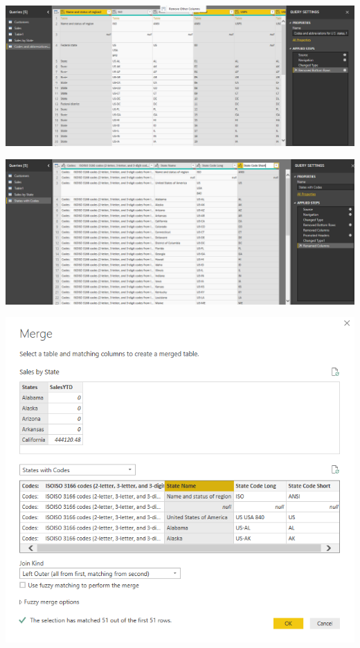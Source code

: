 	\begin{center}
	\includegraphics[width=15cm]{./Imagenes/power18}
	\end{center}	

	\begin{center}
	\includegraphics[width=15cm]{./Imagenes/power19}
	\end{center}	

	\begin{center}
	\includegraphics[width=15cm]{./Imagenes/power20}
	\end{center}	
